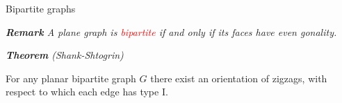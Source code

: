 \documentclass[%
pdf,
colorBG,
slideColor,
]{prosper}
\begin{document}
\begin{slide}{Bipartite graphs}

{\em {\bf Remark}
A plane graph is \textcolor{red}{bipartite} if and only if its faces have even gonality.
}



{\em {\bf Theorem} (Shank-Shtogrin)

For any planar bipartite graph $G$ there exist an orientation of zigzags, with respect to which each edge has type I.
}


\begin{center}
\begin{minipage}{5.5cm}
\end{minipage}
\begin{minipage}{3cm}
\end{minipage}
\end{center}





\end{slide}
\end{document}

